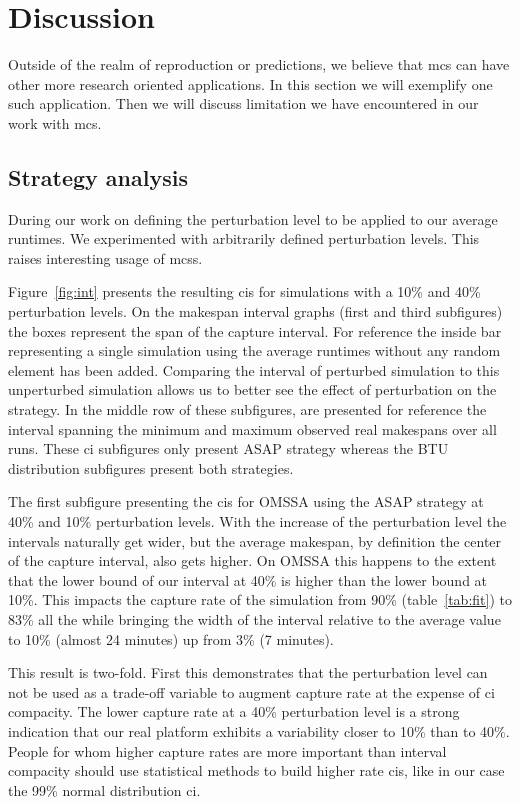 \documentclass[10pt,conference,compsocconf]{IEEEtran}
\begin{document}
\section{Discussion}

Outside of the realm of reproduction or predictions, we believe that \ac{mcs}
can have other more research oriented applications. In this section we will
exemplify one such application. Then we will discuss limitation we have
encountered in our work with \ac{mcs}.

\subsection{Strategy analysis}\label{sec:sa}
During our work on defining the perturbation level to be applied to our average
runtimes. We experimented with arbitrarily defined perturbation levels. This
raises interesting usage of \acp{mcs}.

Figure~\ref{fig:int} presents the resulting \acp{ci} for simulations with a 10\%
and 40\% perturbation levels. On the makespan interval graphs (first and third
subfigures) the boxes represent the span of the capture interval. For reference
the inside bar representing a single simulation using the average runtimes
without any random element has been added.  Comparing the interval of perturbed
simulation to this unperturbed simulation allows us to better see the effect of
perturbation on the strategy. In the middle row of these subfigures, are
presented for reference the interval spanning the minimum and maximum observed
real makespans over all runs. These \ac{ci} subfigures only present ASAP
strategy whereas the BTU distribution subfigures  present both strategies.

The first subfigure presenting the \acp{ci} for OMSSA using the ASAP strategy at
40\% and 10\% perturbation levels. With the increase of the perturbation level
the intervals naturally get wider, but the average makespan, by definition the
center of the capture interval, also gets higher. On OMSSA this happens to the
extent that the lower bound of our interval at 40\% is higher than the lower
bound at 10\%. This impacts the capture rate of the simulation from 90\%
(table~\ref{tab:fit}) to 83\% all the while bringing the width of the interval
relative to the average value to 10\% (almost 24 minutes) up from 3\% (7 minutes).

This result is two-fold. First this demonstrates that the perturbation level can
not be used as a trade-off variable to augment capture rate at the expense of
\ac{ci} compacity. The lower capture rate at a 40\% perturbation level is a
strong indication that our real platform exhibits a variability closer to
10\% than to 40\%. People for whom higher capture rates are more important than
interval compacity should use statistical methods to build higher rate \acp{ci},
like in our case the 99\% normal distribution \ac{ci}.
\end{document}
